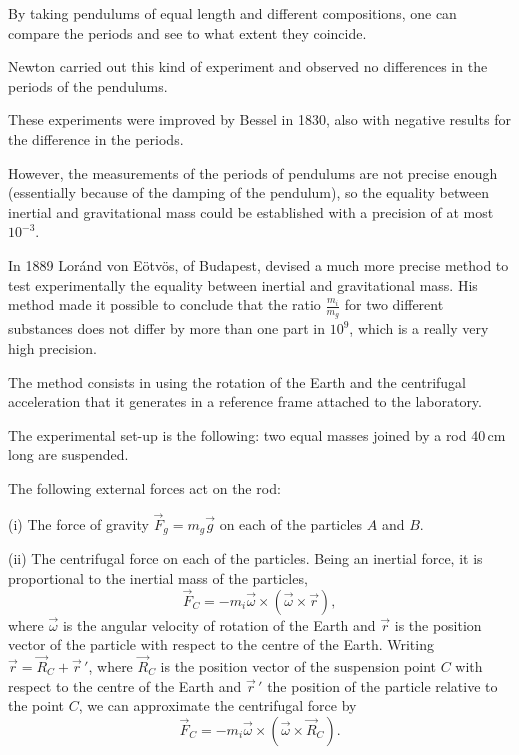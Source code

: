 \begin{points}
\item By taking pendulums of equal length and different compositions, one can compare the periods and see to what extent they coincide.

\item Newton carried out this kind of experiment and observed no differences in the periods of the pendulums.

\item These experiments were improved by Bessel in 1830, also with negative results for the difference in the periods.

\item However, the measurements of the periods of pendulums are not precise enough (essentially because of the damping of the pendulum), so the equality between inertial and gravitational mass could be established with a precision of at most $10^{-3}$.

\item In 1889 Loránd von Eötvös, of Budapest, devised a much more precise method to test experimentally the equality between inertial and gravitational mass. His method made it possible to conclude that the ratio $\frac{m_i}{m_g}$ for two different substances does not differ by more than one part in $10^9$, which is a really very high precision.

\item The method consists in using the rotation of the Earth and the centrifugal acceleration that it generates in a reference frame attached to the laboratory.

\item The experimental set-up is the following: two equal masses joined by a rod 40\,cm long are suspended.

\item The following external forces act on the rod:

(i) The force of gravity $\vec F_g=m_g\vec g$ on each of the particles $A$ and $B$.

(ii) The centrifugal force on each of the particles. Being an inertial force, it is proportional to the inertial mass of the particles,
\[
  \vec F_C=-m_i\vec\omega\times(\vec\omega\times\vec r),
\]
where $\vec\omega$ is the angular velocity of rotation of the Earth and $\vec r$ is the position vector of the particle with respect to the centre of the Earth. Writing $\vec r=\vec R_C+\vec r\,'$, where $\vec R_C$ is the position vector of the suspension point $C$ with respect to the centre of the Earth and $\vec r\,'$ the position of the particle relative to the point $C$, we can approximate the centrifugal force by
\[
  \vec F_C=-m_i\vec\omega\times\left(\vec\omega\times\vec R_C\right).
\]


\end{points}
